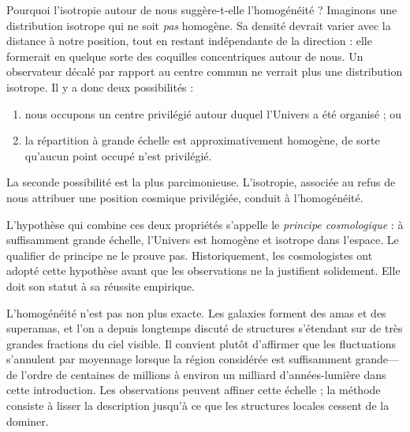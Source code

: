 Pourquoi l’isotropie autour de nous suggère-t-elle l’homogénéité ? Imaginons une distribution isotrope qui ne soit \emph{pas} homogène. Sa densité devrait varier avec la distance à notre position, tout en restant indépendante de la direction : elle formerait en quelque sorte des coquilles concentriques autour de nous. Un observateur décalé par rapport au centre commun ne verrait plus une distribution isotrope. Il y a donc deux possibilités :
\begin{enumerate}
\item nous occupons un centre privilégié autour duquel l’Univers a été organisé ; ou
\item la répartition à grande échelle est approximativement homogène, de sorte qu’aucun point occupé n’est privilégié.
\end{enumerate}
La seconde possibilité est la plus parcimonieuse. L’isotropie, associée au refus de nous attribuer une position cosmique privilégiée, conduit à l’homogénéité.

\begin{classroomqa}
\end{classroomqa}

L’hypothèse qui combine ces deux propriétés s’appelle le \emph{principe cosmologique} : à suffisamment grande échelle, l’Univers est homogène et isotrope dans l’espace. Le qualifier de principe ne le prouve pas. Historiquement, les cosmologistes ont adopté cette hypothèse avant que les observations ne la justifient solidement. Elle doit son statut à sa réussite empirique.

L’homogénéité n’est pas non plus exacte. Les galaxies forment des amas et des superamas, et l’on a depuis longtemps discuté de structures s’étendant sur de très grandes fractions du ciel visible. Il convient plutôt d’affirmer que les fluctuations s’annulent par moyennage lorsque la région considérée est suffisamment grande---de l’ordre de centaines de millions à environ un milliard d’années-lumière dans cette introduction. Les observations peuvent affiner cette échelle ; la méthode consiste à lisser la description jusqu’à ce que les structures locales cessent de la dominer.

